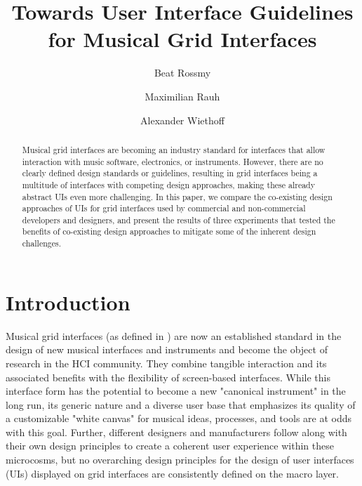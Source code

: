 \documentclass[sigconf]{nimeart}
\begin{document}
\title[Towards User Interface Guidelines for Musical Grid Interfaces]{Towards User Interface Guidelines for Musical Grid Interfaces}
\author{Beat Rossmy}
\author{Maximilian Rauh}
\author{Alexander Wiethoff}
\renewcommand{\shortauthors}{Rossmy et al.}
\begin{abstract}
Musical grid interfaces are becoming an industry standard for interfaces that allow interaction with music software, electronics, or instruments. However, there are no clearly defined design standards or guidelines, resulting in grid interfaces being a multitude of interfaces with competing design approaches, making these already abstract UIs even more challenging. In this paper, we compare the co-existing design approaches of UIs for grid interfaces used by commercial and non-commercial developers and designers, and present the results of three experiments that tested the benefits of co-existing design approaches to mitigate some of the inherent design challenges.
\end{abstract}

\maketitle
\section{Introduction}\label{introduction}

Musical grid interfaces (as defined in \cite{Rossmy2021Musical}) are now an established standard in the design of new musical interfaces and instruments \cite{Rossmy2021Musical} and become the object of research \cite{NIME21_17,10.1145U002F3294109.3295646,10.1145U002F3205873.3210700} in the HCI community. They combine tangible interaction and its associated benefits with the flexibility of screen-based interfaces. While this interface form has the potential to become a new "canonical instrument" \cite{Rossmy2021Musical} in the long run, its generic nature and a diverse user base that emphasizes its quality of a customizable "white canvas" \cite{Rossmy2021Musical} for musical ideas, processes, and tools are at odds with this goal. Further, different designers and manufacturers follow along with their own design principles to create a coherent user experience within these microcosms, but no overarching design principles for the design of user interfaces (UIs) displayed on grid interfaces are consistently defined on the macro layer.
\end{document}
